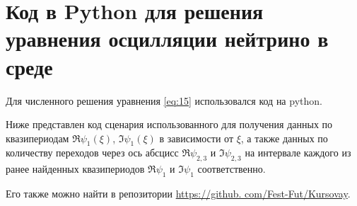 \section{Код в Python для решения уравнения осцилляции нейтрино в среде}
\label{app: code-python-vis}

Для численного решения уравнения \eqref{eq:15} использовался код на python. 


Ниже представлен код сценария использованного для получения данных по квазипериодам \(\Re \psi_1(\xi)\), \(\Im\psi_1(\xi)\) в зависимости от \(\xi\), а также данных по количеству переходов через ось абсцисс \(\Re\psi_{2, 3}\) и \(\Im\psi_{2, 3}\) на интервале каждого из ранее найденных квазипериодов \(\Re\psi_1\) и \(\Im\psi_1\) соответственно. 

Его также можно найти в репозитории \url{https://github. com/Fest-Fut/Kursovay}.

\inputminted[linenos,breaklines,fontsize=\scriptsize]{python}{../run.py}

